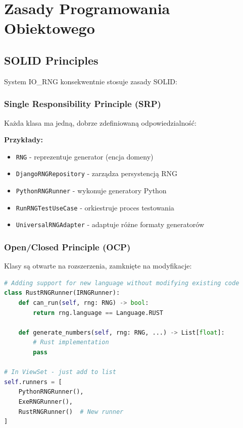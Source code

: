 \documentclass[12pt,a4paper]{article}
\begin{document}
\section{Zasady Programowania Obiektowego}

\subsection{SOLID Principles}

System IO\_RNG konsekwentnie stosuje zasady SOLID:

\subsubsection{Single Responsibility Principle (SRP)}

Każda klasa ma jedną, dobrze zdefiniowaną odpowiedzialność:

\begin{tcolorbox}[colback=green!5!white,colframe=green!75!black]
\textbf{Przykłady:}
\begin{itemize}
    \item \texttt{RNG} - reprezentuje generator (encja domeny)
    \item \texttt{DjangoRNGRepository} - zarządza persystencją RNG
    \item \texttt{PythonRNGRunner} - wykonuje generatory Python
    \item \texttt{RunRNGTestUseCase} - orkiestruje proces testowania
    \item \texttt{UniversalRNGAdapter} - adaptuje różne formaty generatorów
\end{itemize}
\end{tcolorbox}

\subsubsection{Open/Closed Principle (OCP)}

Klasy są otwarte na rozszerzenia, zamknięte na modyfikacje:

\begin{lstlisting}[language=Python, caption=Przyklad OCP - dodanie nowego runnera]
# Adding support for new language without modifying existing code
class RustRNGRunner(IRNGRunner):
    def can_run(self, rng: RNG) -> bool:
        return rng.language == Language.RUST
    
    def generate_numbers(self, rng: RNG, ...) -> List[float]:
        # Rust implementation
        pass

# In ViewSet - just add to list
self.runners = [
    PythonRNGRunner(),
    ExeRNGRunner(),
    RustRNGRunner()  # New runner
]
\end{lstlisting}
\end{document}
